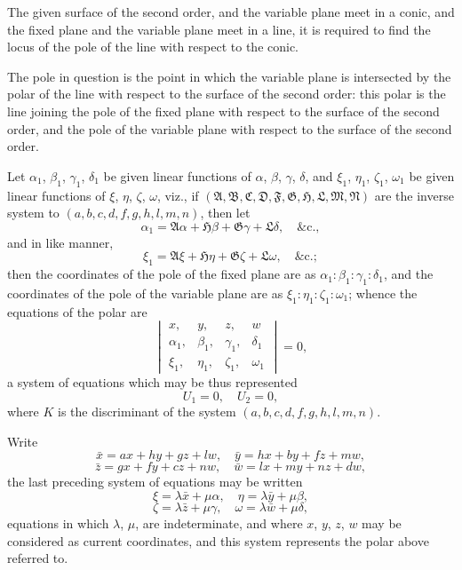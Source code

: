 \documentclass[11pt,a4paper]{book}
\begin{document}
The given surface of the second order, and the variable plane meet in a conic, and the fixed plane and the variable plane meet in a line, it is required to find the locus of the pole of the line with respect to the conic.

The pole in question is the point in which the variable plane is intersected by the polar of the line with respect to the surface of the second order: this polar is the line joining the pole of the fixed plane with respect to the surface of the second order, and the pole of the variable plane with respect to the surface of the second order.

Let $\alpha_1$, $\beta_1$, $\gamma_1$, $\delta_1$ be given linear functions of $\alpha$, $\beta$, $\gamma$, $\delta$, and $\xi_1$, $\eta_1$, $\zeta_1$, $\omega_1$ be given linear functions of $\xi$, $\eta$, $\zeta$, $\omega$, viz., if $(\mathfrak{A}, \mathfrak{B}, \mathfrak{C}, \mathfrak{D}, \mathfrak{F}, \mathfrak{G}, \mathfrak{H}, \mathfrak{L}, \mathfrak{M}, \mathfrak{N})$ are the inverse system to $(a, b, c, d, f, g, h, l, m, n)$, then let
\[
\alpha_1 = \mathfrak{A}\alpha + \mathfrak{H}\beta + \mathfrak{G}\gamma + \mathfrak{L}\delta, \quad \&\text{c.},
\]
and in like manner,
\[
\xi_1 = \mathfrak{A}\xi + \mathfrak{H}\eta + \mathfrak{G}\zeta + \mathfrak{L}\omega, \quad \&\text{c.};
\]
then the coordinates of the pole of the fixed plane are as $\alpha_1 : \beta_1 : \gamma_1 : \delta_1$, and the coordinates of the pole of the variable plane are as $\xi_1 : \eta_1 : \zeta_1 : \omega_1$; whence the equations of the polar are
\[
\begin{vmatrix}
x, & y, & z, & w \\
\alpha_1, & \beta_1, & \gamma_1, & \delta_1 \\
\xi_1, & \eta_1, & \zeta_1, & \omega_1
\end{vmatrix} = 0,
\]
a system of equations which may be thus represented
\[
U_1 = 0, \quad U_2 = 0,
\]
where $K$ is the discriminant of the system $(a, b, c, d, f, g, h, l, m, n)$.

\newpage
[184]

Write
\[
\bar{x} = ax + hy + gz + lw, \quad
\bar{y} = hx + by + fz + mw,
\]
\[
\bar{z} = gx + fy + cz + nw, \quad
\bar{w} = lx + my + nz + dw,
\]
the last preceding system of equations may be written
\[
\xi = \lambda \bar{x} + \mu \alpha, \quad
\eta = \lambda \bar{y} + \mu \beta,
\]
\[
\zeta = \lambda \bar{z} + \mu \gamma, \quad
\omega = \lambda \bar{w} + \mu \delta,
\]
equations in which $\lambda$, $\mu$, are indeterminate, and where $x$, $y$, $z$, $w$ may be considered as current coordinates, and this system represents the polar above referred to.
\end{document}
